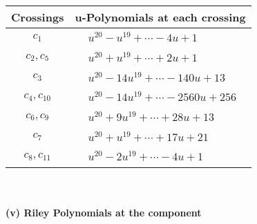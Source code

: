 \documentclass[1p]{elsarticle_modified}
\theoremstyle{definition}
\begin{document}
\begin{tabular}{m{50pt}|m{274pt}}
Crossings & \hspace{64pt}u-Polynomials at each crossing \\
\hline $$\begin{aligned}c_{1}\end{aligned}$$&$\begin{aligned}
&u^{20}- u^{19}+\cdots-4 u+1
\end{aligned}$\\
\hline $$\begin{aligned}c_{2},c_{5}\end{aligned}$$&$\begin{aligned}
&u^{20}+u^{19}+\cdots+2 u+1
\end{aligned}$\\
\hline $$\begin{aligned}c_{3}\end{aligned}$$&$\begin{aligned}
&u^{20}-14 u^{19}+\cdots-140 u+13
\end{aligned}$\\
\hline $$\begin{aligned}c_{4},c_{10}\end{aligned}$$&$\begin{aligned}
&u^{20}-14 u^{19}+\cdots-2560 u+256
\end{aligned}$\\
\hline $$\begin{aligned}c_{6},c_{9}\end{aligned}$$&$\begin{aligned}
&u^{20}+9 u^{19}+\cdots+28 u+13
\end{aligned}$\\
\hline $$\begin{aligned}c_{7}\end{aligned}$$&$\begin{aligned}
&u^{20}+u^{19}+\cdots+17 u+21
\end{aligned}$\\
\hline $$\begin{aligned}c_{8},c_{11}\end{aligned}$$&$\begin{aligned}
&u^{20}-2 u^{19}+\cdots-4 u+1
\end{aligned}$\\
\hline
\end{tabular}\\~\\
\newpage\renewcommand{\arraystretch}{1}
\flushleft \textbf{(v) Riley Polynomials at the component}\newline \\
\end{document}
